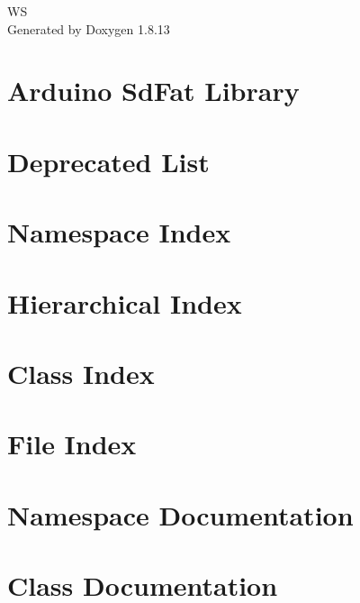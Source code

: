 \documentclass[twoside]{book}
\newcommand{\+}{\discretionary{\mbox{\scriptsize$\hookleftarrow$}}{}{}}
\newcommand{\clearemptydoublepage}{%
  \newpage{\pagestyle{empty}\cleardoublepage}%
}
\begin{document}
\hypersetup{pageanchor=false,
             bookmarksnumbered=true,
             pdfencoding=unicode
            }
\begin{titlepage}
\vspace*{7cm}
\begin{center}%
{\Large WS }\\
\vspace*{1cm}
{\large Generated by Doxygen 1.8.13}\\
\end{center}
\end{titlepage}
\clearemptydoublepage
{}
\tableofcontents
\clearemptydoublepage
{}
\hypersetup{pageanchor=true}

\chapter{Arduino Sd\+Fat Library}
\label{index}\hypertarget{index}{}
\chapter{Deprecated List}
\label{deprecated}

\chapter{Namespace Index}

\chapter{Hierarchical Index}

\chapter{Class Index}

\chapter{File Index}

\chapter{Namespace Documentation}

\chapter{Class Documentation}



























\end{document}
